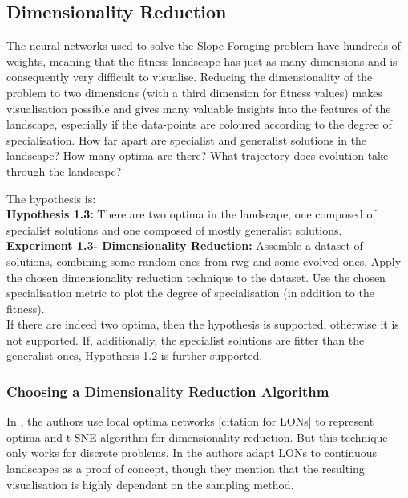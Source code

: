\documentclass[12pt]{article}
\begin{document}
\subsection{Dimensionality Reduction}

The neural networks used to solve the Slope Foraging problem have hundreds of weights, meaning that the fitness landscape has just as many dimensions and is consequently very difficult to visualise.
Reducing the dimensionality of the problem to two dimensions (with a third dimension for fitness values) makes visualisation possible and gives many valuable insights into the features of the landscape, especially if the data-points are coloured according to the degree of specialisation.
How far apart are specialist and generalist solutions in the landscape?
How many optima are there?
What trajectory does evolution take through the landscape?

The hypothesis is:\\

\textbf{Hypothesis 1.3:} There are two optima in the landscape, one composed of specialist solutions and one composed of mostly generalist solutions. \\

\textbf{Experiment 1.3- Dimensionality Reduction:} Assemble a dataset of solutions, combining some random ones from rwg and some evolved ones.
Apply the chosen dimensionality reduction technique to the dataset.
Use the chosen specialisation metric to plot the degree of specialisation (in addition to the fitness).\\

If there are indeed two optima, then the hypothesis is supported, otherwise it is not supported.
If, additionally, the specialist solutions are fitter than the generalist ones, Hypothesis 1.2 is further supported.\\

\subsubsection{Choosing a Dimensionality Reduction Algorithm}

In \cite{veerapen:GPEM:2018}, the authors use local optima networks [citation for LONs] to represent optima and t-SNE algorithm \cite{vanDerMaaten:JMLR:2008} for dimensionality reduction.
But this technique only works for discrete problems.
In \cite{adair:GECCO:2019} the authors adapt LONs to continuous landscapes as a proof of concept, though they mention that the resulting  visualisation is highly dependant on the sampling method.
\end{document}
